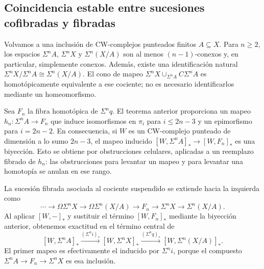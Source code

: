 \subsection{Coincidencia estable entre sucesiones cofibradas y fibradas}
Volvamos a una inclusión de CW-complejos punteados finitos $A\subseteq X$. Para $n\geq2$, los espacios $\Sigma^nA$, $\Sigma^nX$ y $\Sigma^n(X/A)$ son al menos $(n-1)$-conexos y, en particular, simplemente conexos. Además, existe una identificación natural $\Sigma^nX/\Sigma^nA\cong\Sigma^n(X/A)$. El cono de mapeo $\Sigma^nX\cup_{\Sigma^nA}C\Sigma^nA$ es homotópicamente equivalente a ese cociente; no es necesario identificarlos mediante un homeomorfismo.

Sea $F_n$ la fibra homotópica de $\Sigma^nq$. El teorema anterior proporciona un mapeo $h_n\colon\Sigma^nA\to F_n$ que induce isomorfismos en $\pi_i$ para $i\leq2n-3$ y un epimorfismo para $i=2n-2$. En consecuencia, si $W$ es un CW-complejo punteado de dimensión a lo sumo $2n-3$, el mapeo inducido $[W,\Sigma^nA]_*\to[W,F_n]_*$ es una biyección. Esto se obtiene por obstrucciones celulares, aplicadas a un reemplazo fibrado de $h_n$: las obstrucciones para levantar un mapeo y para levantar una homotopía se anulan en ese rango.

La sucesión fibrada asociada al cociente suspendido se extiende hacia la izquierda como
\[
\cdots\longrightarrow\Omega\Sigma^nX\longrightarrow\Omega\Sigma^n(X/A)
\longrightarrow F_n\longrightarrow\Sigma^nX\longrightarrow\Sigma^n(X/A).
\]
Al aplicar $[W,-]_*$ y sustituir el término $[W,F_n]_*$ mediante la biyección anterior, obtenemos exactitud en el término central de
\[
[W,\Sigma^nA]_*\xrightarrow{(\Sigma^ni)_*}[W,\Sigma^nX]_*
\xrightarrow{(\Sigma^nq)_*}[W,\Sigma^n(X/A)]_*.
\]
El primer mapeo es efectivamente el inducido por $\Sigma^ni$, porque el compuesto $\Sigma^nA\to F_n\to\Sigma^nX$ es esa inclusión. 

